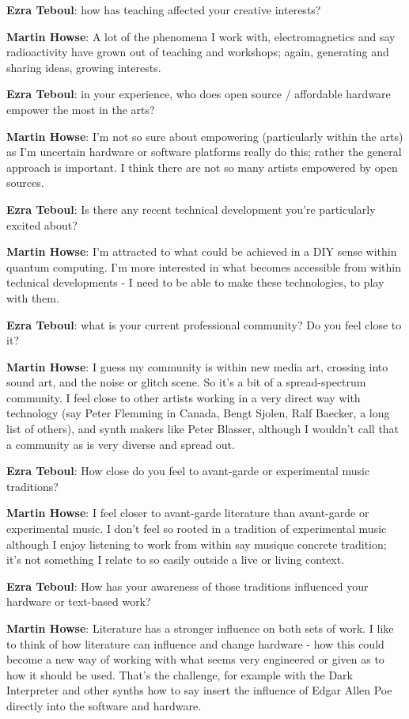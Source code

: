 \textbf{Ezra Teboul}: how has teaching affected your creative interests?

\textbf{Martin Howse}: A lot of the phenomena I work with, electromagnetics and say
radioactivity have grown out of teaching and workshops; again, generating and sharing
ideas, growing interests.

\textbf{Ezra Teboul}: in your experience, who does open source / affordable hardware
empower the most in the arts?

\textbf{Martin Howse}: I'm not so sure about empowering (particularly within the arts)
as I'm uncertain hardware or software platforms really do this; rather the general
approach is important. I think there are not so many artists empowered by open sources.

\textbf{Ezra Teboul}: Is there any recent technical development you're particularly
excited about?

\textbf{Martin Howse}: I'm attracted to what could be achieved in a DIY sense within
quantum computing. I'm more interested in what becomes accessible from within technical
developments - I need to be able to make these technologies, to play with them.

\textbf{Ezra Teboul}: what is your current professional community? Do you feel close to
it?

\textbf{Martin Howse}: I guess my community is within new media art, crossing into sound
art, and the noise or glitch scene. So it's a bit of a spread-spectrum community. I feel
close to other artists working in a very direct way with technology (say Peter Flemming
in Canada, Bengt Sjolen, Ralf Baecker, a long list of others), and synth makers like
Peter Blasser, although I wouldn't call that a community as is very diverse and spread
out.

\textbf{Ezra Teboul}: How close do you feel to avant-garde or experimental music
traditions?

\textbf{Martin Howse}: I feel closer to avant-garde literature than avant-garde or
experimental music. I don't feel so rooted in a tradition of experimental music although
I enjoy listening to work from within say musique concrete tradition; it's not something
I relate to so easily outside a live or living context.

\textbf{Ezra Teboul}: How has your awareness of those traditions influenced your
hardware or text-based work?

\textbf{Martin Howse}: Literature has a stronger influence on both sets of work. I like
to think of how literature can influence and change hardware - how this could become a
new way of working with what seems very engineered or given as to how it should be used.
That's the challenge, for example with the Dark Interpreter and other synths how to say
insert the influence of Edgar Allen Poe directly into the software and hardware.

